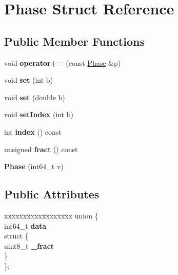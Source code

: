 \hypertarget{struct_phase}{}\section{Phase Struct Reference}
\label{struct_phase}
\subsection*{Public Member Functions}
\begin{DoxyCompactItemize}
\item 
\mbox{\label{struct_phase_aba2ba2bec8cab086febd425bf425d268}} 
void {\bfseries operator+=} (const \hyperlink{struct_phase}{Phase} \&p)
\item 
\mbox{\label{struct_phase_adf141dacf243fcb7a79c21efc24fb76d}} 
void {\bfseries set} (int b)
\item 
\mbox{\label{struct_phase_aec6c8d5d4edf1eb40db0fd6bf20ed36c}} 
void {\bfseries set} (double b)
\item 
\mbox{\label{struct_phase_aeaa6afaf0249d08215e5cd286c2dbb13}} 
void {\bfseries set\+Index} (int b)
\item 
\mbox{\label{struct_phase_aa8862a18f45794dc31e1aaa6bfbb1ec0}} 
int {\bfseries index} () const
\item 
\mbox{\label{struct_phase_a2fd3fa2b4ac20ead08c810d1c590c8b8}} 
unsigned {\bfseries fract} () const
\item 
\mbox{\label{struct_phase_adba2f8fb0632e067d3160b82d127d4d0}} 
{\bfseries Phase} (int64\+\_\+t v)
\end{DoxyCompactItemize}
\subsection*{Public Attributes}
\begin{DoxyCompactItemize}
\item 
\mbox{\label{struct_phase_a396c71ac21413d904ad3b6379a8734d9}} 
\begin{tabbing}
xx\=xx\=xx\=xx\=xx\=xx\=xx\=xx\=xx\=\kill
union \{\\
\>int64\_t {\bfseries data}\\
\mbox{\label{union_phase_1_1_0D145_a611bb028b999fba63e3c55394cae3523}} 
\>struct \{\\
\>\>uint8\_t {\bfseries \_fract}\\
\>\} \\
\}; \\

\end{tabbing}\end{DoxyCompactItemize}


